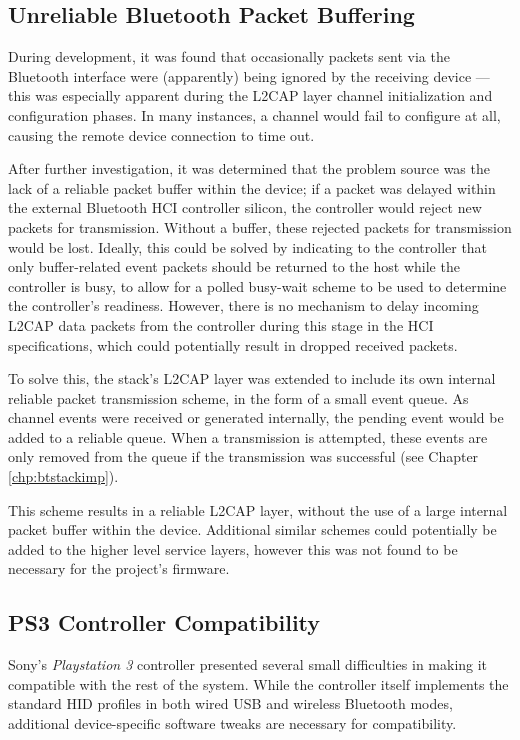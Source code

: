 \FloatBarrier
\subsection{Unreliable Bluetooth Packet Buffering}

During development, it was found that occasionally packets sent via the Bluetooth interface were (apparently) being ignored by the receiving device --- this was especially apparent during the L2CAP layer channel initialization and configuration phases. In many instances, a channel would fail to configure at all, causing the remote device connection to time out.

After further investigation, it was determined that the problem source was the lack of a reliable packet buffer within the device; if a packet was delayed within the external Bluetooth HCI controller silicon, the controller would reject new packets for transmission. Without a buffer, these rejected packets for transmission would be lost. Ideally, this could be solved by indicating to the controller that only buffer-related event packets should be returned to the host while the controller is busy, to allow for a polled busy-wait scheme to be used to determine the controller's readiness. However, there is no mechanism to delay incoming L2CAP data packets from the controller during this stage in the HCI specifications, which could potentially result in dropped received packets.

To solve this, the stack's L2CAP layer was extended to include its own internal reliable packet transmission scheme, in the form of a small event queue. As channel events were received or generated internally, the pending event would be added to a reliable queue. When a transmission is attempted, these events are only removed from the queue if the transmission was successful (see Chapter \ref{chp:btstackimp}).

This scheme results in a reliable L2CAP layer, without the use of a large internal packet buffer within the device. Additional similar schemes could potentially be added to the higher level service layers, however this was not found to be necessary for the project's firmware.

\FloatBarrier
\subsection{PS3 Controller Compatibility}

Sony's \textit{Playstation 3} controller presented several small difficulties in making it compatible with the rest of the system. While the controller itself implements the standard HID profiles in both wired USB and wireless Bluetooth modes, additional device-specific software tweaks are necessary for compatibility.

